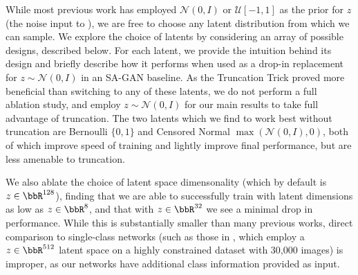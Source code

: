 While most previous work has employed $\mathcal{N}(0, I)$ or $\mathcal{U}[-1, 1]$ as the prior for $z$ (the noise input to \gen{}), we are free to choose any latent distribution from which we can sample.  We explore the choice of latents by considering an array of possible designs, described below. For each latent, we provide the intuition behind its design and briefly describe how it performs when used as a drop-in replacement for  $z\sim\mathcal{N}(0, I)$ in an SA-GAN baseline. As the Truncation Trick proved more beneficial than switching to any of these latents, we do not perform a full ablation study, and employ $z\sim\mathcal{N}(0, I)$ for our main results to take full advantage of truncation. The two latents which we find to work best without truncation are  Bernoulli $\{0, 1\}$ and Censored Normal $\max\left(\mathcal{N}(0, I), 0\right)$, both of which improve speed of training and lightly improve final performance, but are less amenable to truncation. 

We also ablate the choice of latent space dimensonality (which by default is $z\in \bbR^{128}$), finding that we are able to successfully train with latent dimensions as low as $z\in \bbR^{8}$, and that with $z\in \bbR^{32}$ we see a minimal drop in performance. While this is substantially smaller than many previous works, direct comparison to single-class networks (such as those in \citet{karras2018progan}, which employ a $z\in \bbR^{512}$ latent space on a highly constrained dataset with 30,000 images) is improper, as our networks have additional class information provided as input.

